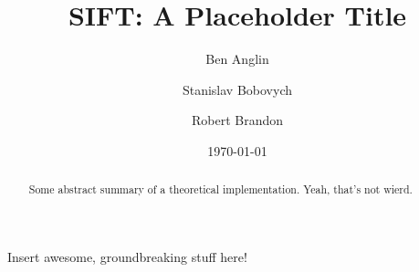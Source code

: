 \documentclass[a4paper, 11pt]{article}
\begin{document}
\title{SIFT: A Placeholder Title}
\author{Ben Anglin \and Stanislav Bobovych \and Robert Brandon}
\date{\today}
\maketitle

\begin{abstract}
Some abstract summary of a theoretical implementation. Yeah, that's not wierd.
\end{abstract}

Insert awesome, groundbreaking stuff here!
\end{document}

